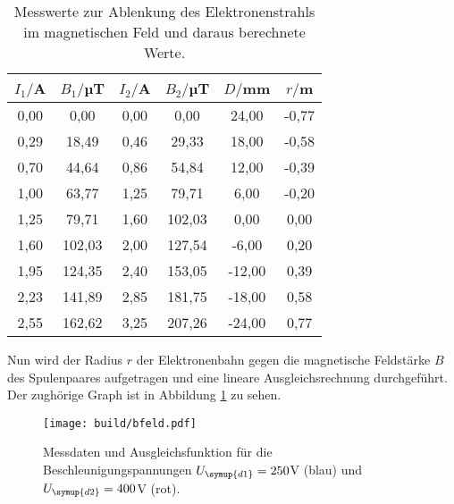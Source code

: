 \begin{table}[htp]
	\begin{center}
    \caption{Messwerte zur Ablenkung des Elektronenstrahls im magnetischen Feld und
    daraus berechnete Werte.}
    \label{tab:magnetisch}
		\begin{tabular}{cccccc}
		\toprule
			{$I_1/$A} & {$B_1/$µT} & {$I_2/$A} & {$B_2/$µT} & {$D/$mm} & {$r/$m}\\
			\midrule
			0,00 & 0,00  & 0,00 &  0,00 & 24,00 & -0,77\\
			0,29 & 18,49 & 0,46 & 29,33 & 18,00 & -0,58\\
			0,70 & 44,64 & 0,86 & 54,84 & 12,00 & -0,39\\
			1,00 & 63,77 & 1,25 & 79,71 & 6,00 & -0,20\\
			1,25 & 79,71 & 1,60 & 102,03 & 0,00 & 0,00\\
			1,60 & 102,03 & 2,00 & 127,54 & -6,00 & 0,20\\
			1,95 & 124,35 & 2,40 & 153,05 & -12,00 & 0,39\\
			2,23 & 141,89 & 2,85 & 181,75 & -18,00 & 0,58\\
			2,55 & 162,62 & 3,25 & 207,26 & -24,00 & 0,77\\
		\bottomrule
		\end{tabular}
	\end{center}
\end{table}

Nun wird der Radius $r$ der Elektronenbahn gegen die magnetische Feldstärke $B$
des Spulenpaares aufgetragen und eine lineare Ausgleichsrechnung durchgeführt.
Der zughörige Graph ist in Abbildung \ref{fig:bfeld} zu sehen.

\begin{figure}[h]
  \centering
  \texttt{[image: build/bfeld.pdf]}
  \caption{Messdaten und Ausgleichsfunktion für die Beschleunigungspannungen
  $U_{\symup{d1}}=250$V (blau) und $U_{\symup{d2}}=400$V (rot).}
  \label{fig:bfeld}
\end{figure}
